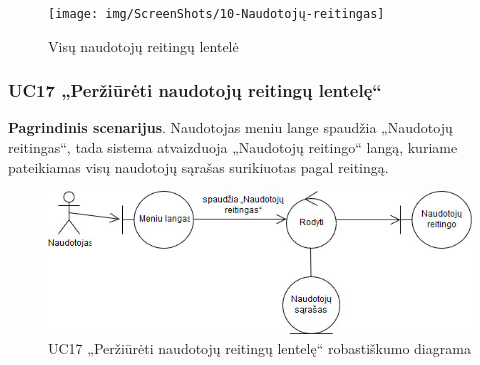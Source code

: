 \documentclass{VUMIFPSbakalaurinis}
\begin{document}
\begin{figure}[H]
	\centering
	\texttt{[image: img/ScreenShots/10-Naudotojų-reitingas]}
	\caption{Visų naudotojų reitingų lentelė}
	\label{img:rating table}
\end{figure}
\subsubsection{UC17 „Peržiūrėti naudotojų reitingų lentelę“}
\textbf{Pagrindinis scenarijus}. Naudotojas meniu lange spaudžia „Naudotojų reitingas“, tada sistema atvaizduoja „Naudotojų reitingo“ langą, kuriame pateikiamas visų naudotojų sąrašas surikiuotas pagal reitingą.

\begin{figure}[H]
	\centering
	\includegraphics[scale=0.6]{img/Robustness/UC17}
	\caption{UC17 „Peržiūrėti naudotojų reitingų lentelę“ robastiškumo diagrama}
	\label{img:uc17rob}
\end{figure}
\end{document}
